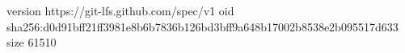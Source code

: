 version https://git-lfs.github.com/spec/v1
oid sha256:d0d91bff21ff3981e8b6b7836b126bd3bff9a648b17002b8538e2b095517d633
size 61510
